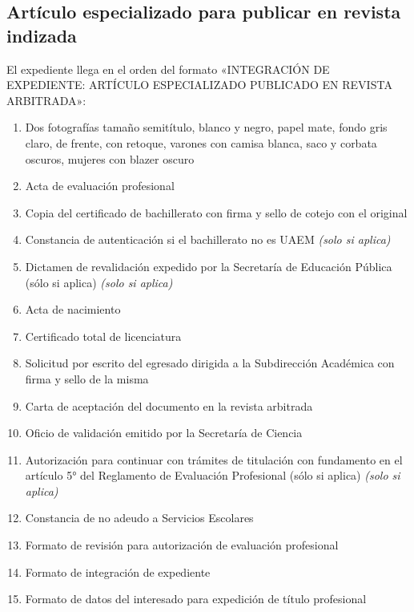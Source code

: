 \subsection{Artículo especializado para publicar en revista indizada}
El expediente llega en el orden del formato «INTEGRACIÓN DE EXPEDIENTE: ARTÍCULO ESPECIALIZADO PUBLICADO EN REVISTA ARBITRADA»:
\begin{enumerate}
  \item Dos fotografías tamaño semitítulo, blanco y negro, papel mate, fondo gris claro, de frente, con retoque, varones con camisa blanca, saco y corbata oscuros, mujeres con blazer oscuro
  \item Acta de evaluación profesional
  \item Copia del certificado de bachillerato con firma y sello de cotejo con el original
  \item Constancia de autenticación si el bachillerato no es UAEM \emph{(solo si aplica)}
  \item Dictamen de revalidación expedido por la Secretaría de Educación Pública (sólo si aplica) \emph{(solo si aplica)}
  \item Acta de nacimiento
  \item Certificado total de licenciatura
  \item Solicitud por escrito del egresado dirigida a la Subdirección Académica con firma y sello de la misma
  \item Carta de aceptación del documento en la revista arbitrada
  \item Oficio de validación emitido por la Secretaría de Ciencia
  \item Autorización para continuar con trámites de titulación con fundamento en el artículo 5° del Reglamento de Evaluación Profesional (sólo si aplica) \emph{(solo si aplica)}
  \item Constancia de no adeudo a Servicios Escolares
  \item Formato de revisión para autorización de evaluación profesional
  \item Formato de integración de expediente
  \item Formato de datos del interesado para expedición de título profesional
\end{enumerate}
